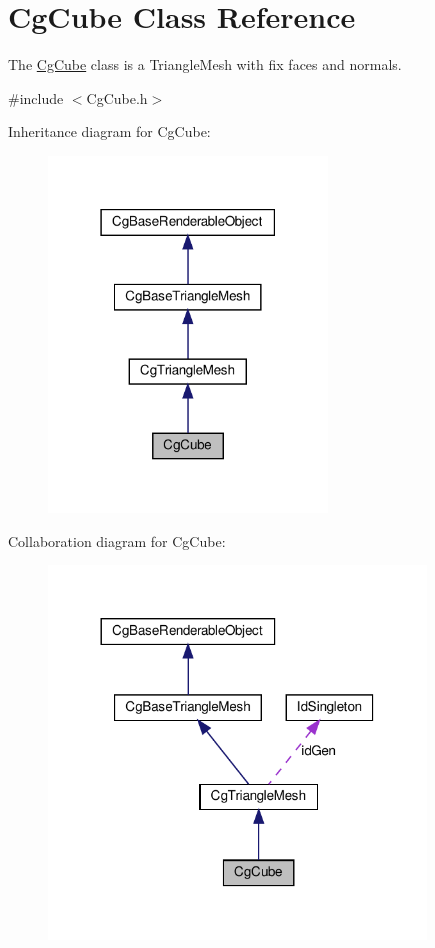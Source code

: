 \hypertarget{class_cg_cube}{}\section{Cg\+Cube Class Reference}
\label{class_cg_cube}


The \hyperlink{class_cg_cube}{Cg\+Cube} class is a Triangle\+Mesh with fix faces and normals.  




{\ttfamily \#include $<$Cg\+Cube.\+h$>$}



Inheritance diagram for Cg\+Cube\+:
\nopagebreak
\begin{figure}[H]
\begin{center}
\leavevmode
\includegraphics[width=210pt]{class_cg_cube__inherit__graph}
\end{center}
\end{figure}


Collaboration diagram for Cg\+Cube\+:
\nopagebreak
\begin{figure}[H]
\begin{center}
\leavevmode
\includegraphics[width=284pt]{class_cg_cube__coll__graph}
\end{center}
\end{figure}

